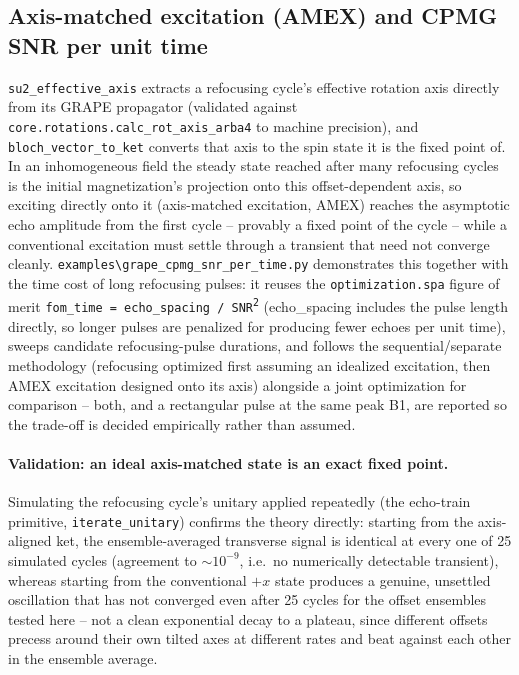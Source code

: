 \documentclass[11pt,oneside]{report}
\newcommand{\code}[1]{\texttt{#1}}
\begin{document}
\subsection{Axis-matched excitation (AMEX) and CPMG SNR per unit time}

\code{su2\_effective\_axis} extracts a refocusing cycle's effective rotation
axis directly from its GRAPE propagator (validated against
\code{core.rotations.calc\_rot\_axis\_arba4} to machine precision), and
\code{bloch\_vector\_to\_ket} converts that axis to the spin state it is the
fixed point of. In an inhomogeneous field the steady state reached after many
refocusing cycles is the initial magnetization's projection onto this
offset-dependent axis, so exciting directly onto it (axis-matched excitation,
AMEX) reaches the asymptotic echo amplitude from the first cycle -- provably a
fixed point of the cycle -- while a conventional excitation must settle
through a transient that need not converge cleanly.
\code{examples\textbackslash grape\_cpmg\_snr\_per\_time.py} demonstrates
this together with the time cost of long refocusing pulses: it reuses the
\code{optimization.spa} figure of merit \code{fom\_time = echo\_spacing /
SNR\textsuperscript{2}} (echo\_spacing includes the pulse length directly, so
longer pulses are penalized for producing fewer echoes per unit time), sweeps
candidate refocusing-pulse durations, and follows the sequential/separate
methodology (refocusing optimized first assuming an idealized excitation,
then AMEX excitation designed onto its axis) alongside a joint
optimization for comparison -- both, and a rectangular pulse at the same peak
B1, are reported so the trade-off is decided empirically rather than assumed.

\paragraph{Validation: an ideal axis-matched state is an exact fixed point.}
Simulating the refocusing cycle's unitary applied repeatedly (the echo-train
primitive, \code{iterate\_unitary}) confirms the theory directly: starting
from the axis-aligned ket, the ensemble-averaged transverse signal is
identical at every one of 25 simulated cycles (agreement to \(\sim 10^{-9}\),
i.e.\ no numerically detectable transient), whereas starting from the
conventional \(+x\) state produces a genuine, unsettled oscillation that has
not converged even after 25 cycles for the offset ensembles tested here --
not a clean exponential decay to a plateau, since different offsets precess
around their own tilted axes at different rates and beat against each other
in the ensemble average.
\end{document}

